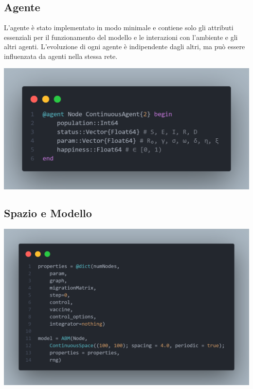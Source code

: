 \subsection{Agente}

L'agente è stato implementato in modo minimale e contiene solo gli 
attributi essenziali per il funzionamento del modello e le 
interazioni con l'ambiente e gli altri agenti. L'evoluzione di ogni 
agente è indipendente dagli altri, ma può essere influenzata da agenti 
nella stessa rete.

\begin{minipage}{\linewidth}
    \centering
    \includegraphics[width=\textwidth]{img/node_agent.png}
    \label{fig:Agent_code}
\end{minipage}

\subsection{Spazio e Modello}

\begin{minipage}{\linewidth}
    \centering
    \includegraphics[width=\textwidth]{img/sngraph_model.png}
    \label{fig:Model_code}
\end{minipage}

